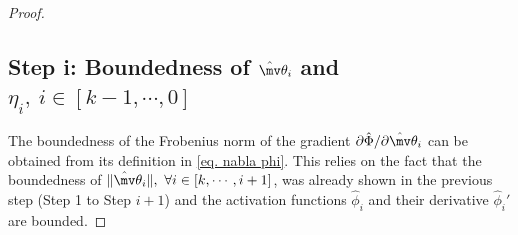 \documentclass[lettersize,journal]{IEEEtran}
\newcommand*{\wth}{\mv\theta}
\begin{document}
\begin{proof}




\subsection*{Step i: Boundedness of $\hat\wth_i$ and $\eta_i, \ i\in[k-1,\cdots,0]$}


The boundedness of the Frobenius norm of the gradient $\partial\hat\Phi/\partial \hat\wth_i$ can be obtained from its definition in \eqref{eq. nabla phi}. This relies on the fact that the boundedness of $\Vert\hat\wth_i\Vert,\ \forall i\in[k,\cdots,i+1]$, was already shown in the previous step (\ie Step 1 to Step $i+1$) and the activation functions $\hat\phi_i$ and their derivative $\hat\phi_i'$ are bounded.


\end{proof}
\end{document}
